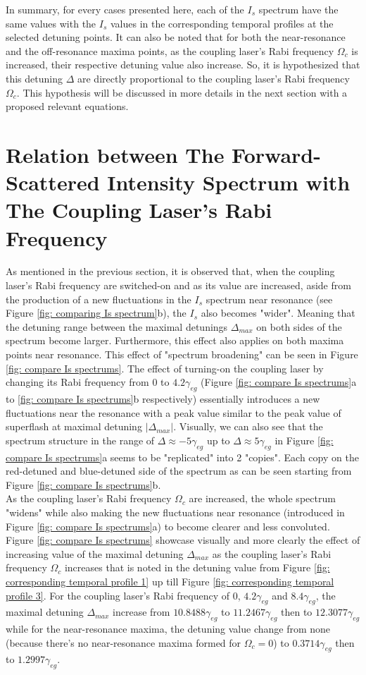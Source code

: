 In summary, for every cases presented here, each of the $I_{s}$ spectrum have the same values with the $I_{s}$ values in the corresponding temporal profiles at the selected detuning points. It can also be noted that for both the near-resonance and the off-resonance maxima points, as the coupling laser's Rabi frequency $\Omega_{c}$ is increased, their respective detuning value also increase. So, it is hypothesized that this detuning $\Delta$ are directly proportional to the coupling laser's Rabi frequency $\Omega_{c}$. This hypothesis will be discussed in more details in the next section with a proposed relevant equations.


\section{Relation between The Forward-Scattered Intensity Spectrum with The Coupling Laser's Rabi Frequency}
As mentioned in the previous section, it is observed that, when the coupling laser's Rabi frequency are switched-on and as its value are increased, aside from the production of a new fluctuations in the $I_{s}$ spectrum near resonance (see Figure \ref{fig: comparing Is spectrum}b), the $I_{s}$ also becomes "wider". Meaning  that the detuning range between the maximal detunings $\Delta_{max}$ on both sides of the spectrum become larger. Furthermore, this effect also applies on both maxima points near resonance. This effect of "spectrum broadening" can be seen in Figure \ref{fig: compare Is spectrums}. The effect of turning-on the coupling laser by changing its Rabi frequency from $0$ to $4.2\gamma_{eg}$ (Figure \ref{fig: compare Is spectrums}a to \ref{fig: compare Is spectrums}b respectively) essentially introduces a new fluctuations near the resonance with a peak value similar to the peak value of superflash at maximal detuning $|\Delta_{max}|$. Visually, we can also see that the spectrum structure in the range of  $\Delta \approx -5\gamma_{eg}$ up to $\Delta \approx 5\gamma_{eg}$ in Figure \ref{fig: compare Is spectrums}a seems to be "replicated" into 2 "copies". Each copy on the red-detuned and blue-detuned side of the spectrum as can be seen starting from Figure \ref{fig: compare Is spectrums}b.\\

As the coupling laser's Rabi frequency $\Omega_{c}$ are increased, the whole spectrum "widens" while also making the new fluctuations near resonance (introduced in Figure \ref{fig: compare Is spectrums}a) to become clearer and less convoluted. Figure \ref{fig: compare Is spectrums} showcase visually and more clearly the effect of increasing value of the maximal detuning $\Delta_{max}$ as the coupling laser's Rabi frequency $\Omega_{c}$ increases that is noted in the detuning value from Figure \ref{fig: corresponding temporal profile 1} up till Figure \ref{fig: corresponding temporal profile 3}. For the coupling laser's Rabi frequency of $0$, $4.2\gamma_{eg}$ and $8.4\gamma_{eg}$, the maximal detuning $\Delta_{max}$ increase from $10.8488\gamma_{eg}$ to $11.2467\gamma_{eg}$ then to $12.3077\gamma_{eg}$ while for the near-resonance maxima, the detuning value change from none (because there's no near-resonance maxima formed for $\Omega_{c} = 0$) to $0.3714\gamma_{eg}$ then to $1.2997\gamma_{eg}$.

